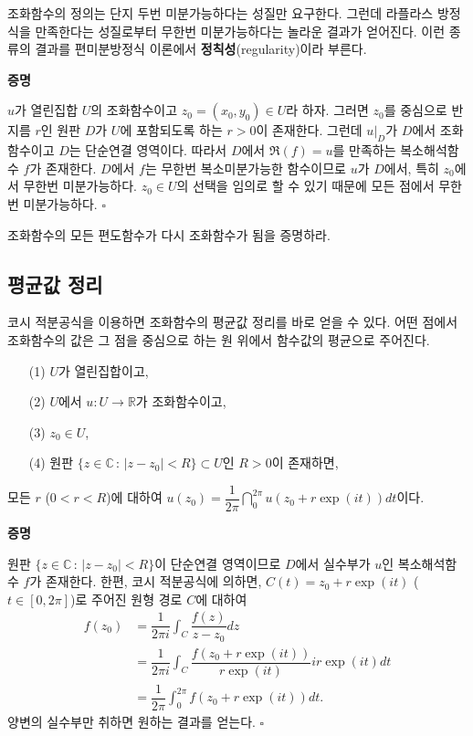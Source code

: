 조화함수의 정의는 단지 두번 미분가능하다는 성질만 요구한다.
그런데 라플라스 방정식을 만족한다는 성질로부터 무한번 미분가능하다는 놀라운 결과가 얻어진다.
이런 종류의 결과를 편미분방정식 이론에서 \textbf{정칙성}(regularity)이라 부른다.

{\bf 증명}

$u$가 열린집합 $U$의 조화함수이고 $z_0=(x_0,y_0) \in U$라 하자.
그러면 $z_0$를 중심으로 반지름 $r$인 원판 $D$가 $U$에  포함되도록 하는 $r>0$이 존재한다.
그런데 $u|_D$가 $D$에서 조화함수이고 $D$는 단순연결 영역이다.
따라서 $D$에서 $\Re(f)=u$를 만족하는 복소해석함수 $f$가 존재한다.
$D$에서 $f$는 무한번 복소미분가능한 함수이므로
$u$가 $D$에서, 특히 $z_0$에서 무한번 미분가능하다.
$z_0\in U$의 선택을 임의로 할 수 있기 때문에 모든 점에서 무한번 미분가능하다.
\hfill $\square$

\begin{salt_exercise}\label{ex-5-7}
조화함수의 모든 편도함수가 다시 조화함수가 됨을 증명하라.
\end{salt_exercise}

\subsection{평균값 정리}

코시 적분공식을 이용하면
조화함수의 평균값 정리를 바로 얻을 수 있다.
어떤 점에서 조화함수의 값은 그 점을 중심으로 하는 원 위에서 함수값의 평균으로 주어진다.

\begin{salttheorem}  {}{} \label{thm-5-3}

\begin{itemize}
\item[(1)] $U$가 열린집합이고,
\item[(2)] $U$에서 $u:U\to\mathbb R$가 조화함수이고,
\item[(3)] $z_0\in U$,
\item[(4)] 원판 $\{ z\in\mathbb C\,:\, |z-z_0|<R \} \subset U$인 $R>0$이 존재하면,
\end{itemize}
모든 $r$ ($0<r<R$)에 대하여
$u(z_0) = \dfrac1{2\pi} \dint_0^{2\pi} u(z_0 + r\exp(it))dt$이다.
\end{salttheorem}

{\bf 증명}

원판 $\{ z\in\mathbb C\,:\, |z-z_0|<R \} $이 단순연결 영역이므로
$D$에서 실수부가 $u$인 복소해석함수 $f$가 존재한다.
한편, 코시 적분공식에 의하면, 
$C(t) = z_0 + r\exp(it)$ ($t\in[0,2\pi]$)로 주어진 원형 경로 $C$에 대하여 
\begin{align*}
f(z_0) &= \dfrac1{2\pi i} \int_C \dfrac{f(z)}{z-z_0} dz \\
&= \dfrac1{2\pi i} \int_C \dfrac{f(z_0+r\exp(it))}{r\exp(it)} ir\exp(it) dt\\
&= \dfrac1{2\pi} \int_0^{2\pi} f(z_0+r\exp(it)) dt.
\end{align*}
양변의 실수부만 취하면 원하는 결과를 얻는다.
\hfill $\square$

